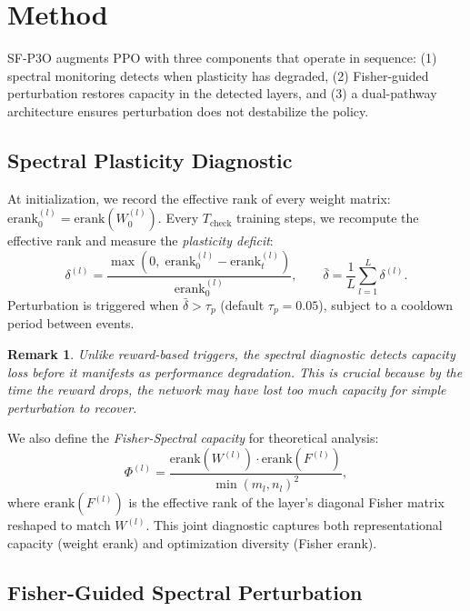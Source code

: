 \documentclass{article}
\newtheorem{remark}{Remark}
\newcommand{\erank}{\mathrm{erank}}
\begin{document}
\section{Method}
\label{sec:method}

SF-P3O augments PPO with three components that operate in sequence: (1) spectral monitoring detects when plasticity has degraded, (2) Fisher-guided perturbation restores capacity in the detected layers, and (3) a dual-pathway architecture ensures perturbation does not destabilize the policy.

\subsection{Spectral Plasticity Diagnostic}
\label{sec:spectral_diag}

At initialization, we record the effective rank of every weight matrix: $\erank_0^{(l)} = \erank(W_0^{(l)})$. Every $T_{\text{check}}$ training steps, we recompute the effective rank and measure the \emph{plasticity deficit}:
\begin{equation}
    \delta^{(l)} = \frac{\max(0,\; \erank_0^{(l)} - \erank_t^{(l)})}{\erank_0^{(l)}}, \qquad
    \bar{\delta} = \frac{1}{L} \sum_{l=1}^{L} \delta^{(l)}.
    \label{eq:deficit}
\end{equation}
Perturbation is triggered when $\bar{\delta} > \tau_p$ (default $\tau_p = 0.05$), subject to a cooldown period between events.

\begin{remark}
Unlike reward-based triggers, the spectral diagnostic detects capacity loss \emph{before} it manifests as performance degradation. This is crucial because by the time the reward drops, the network may have lost too much capacity for simple perturbation to recover.
\end{remark}

We also define the \emph{Fisher-Spectral capacity} for theoretical analysis:
\begin{equation}
    \Phi^{(l)} = \frac{\erank(W^{(l)}) \cdot \erank(F^{(l)})}{\min(m_l, n_l)^2},
\end{equation}
where $\erank(F^{(l)})$ is the effective rank of the layer's diagonal Fisher matrix reshaped to match $W^{(l)}$. This joint diagnostic captures both representational capacity (weight erank) and optimization diversity (Fisher erank).


\subsection{Fisher-Guided Spectral Perturbation}
\label{sec:perturb}
\end{document}
